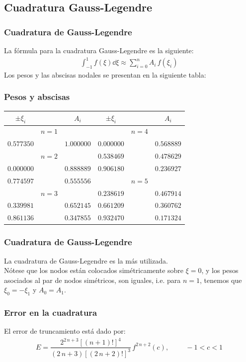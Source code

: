 \subsection{Cuadratura Gauss-Legendre}
\begin{frame}[plain]
\frametitle{Cuadratura de Gauss-Legendre}
La fórmula para la cuadratura Gauss-Legendre es la siguiente:
\begin{align*}
\int_{-1}^{1} f(\xi) \dd{\xi} \approx \sum_{i=0}^{n} A_{i} \, f(\xi_{i})
\end{align*}
Los pesos y las abscisas nodales se presentan en la siguiente tabla:
\end{frame}
\begin{frame}
\frametitle{Pesos y abscisas}
\fontsize{10}{10}\selectfont
\begin{center}
\begin{tabular}{|c c c | c c c|}
\hline
$\pm \xi_{i}$ & & $A_{i}$ & $\pm \xi_{i}$ &  & $A_{i}$ \\ \hline
 & $n=1$ & & & $n=4$ & \\ %
$0.577350$ & & $1.000000$ & $0.000000$ & & $0.568889$ \\ %
 & $n=2$ & & $0.538469$ & & $0.478629$ \\ %
$0.000000$ & & $0.888889$ & $0.906180$ & & $0.236927$ \\ %
$0.774597$ & & $0.555556$ & & $n=5$ & \\ %
 & $n=3$ & & $0.238619$ & & $0.467914$ \\ %
$0.339981$ & & $0.652145$ & $0.661209$ & & $0.360762$ \\ %
$0.861136$ & & $0.347855$ & $0.932470$ & & $0.171324$ \\ \hline
\end{tabular}
\end{center}
\end{frame}
\begin{frame}
\frametitle{Cuadratura de Gauss-Legendre}
La cuadratura de Gauss-Legendre es la más utilizada. 
\\
\bigskip
Nótese que los nodos están colocados simétricamente sobre $\xi=0$, y los pesos asociados al par de nodos simétricos, son iguales, i.e. para $n=1$, tenemos que $\xi_{0} = - \xi_{1}$ y $A_{0} = A_{1}$.
\end{frame}
\begin{frame}
\frametitle{Error en la cuadratura}
El error de truncamiento está dado por:
\begin{align*}
E = \dfrac{2^{2 \, n + 3} [(n + 1)!]^{4}}{(2 \, n + 3)[(2 \, n + 2)!]^{3}} \, f^{2 \, n + 2} (c), \hspace{1cm} -1 < c < 1
\end{align*}
\end{frame}

